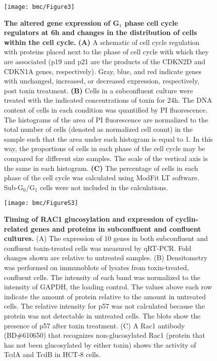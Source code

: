 \begin{SCfigure}
  \centering
  \texttt{[image: bmc/Figure3]}
  \caption[The altered gene expression of 
  G$_{\text{1}}$ phase cell cycle regulators 
  at 6h and changes in the distribution of cells 
  within the cell cycle]{
  \textbf{The altered gene expression of 
  G$_{\text{1}}$ phase cell cycle regulators 
  at 6h and changes in the distribution of cells 
  within the cell cycle.}
  \textbf{(A)} A schematic of cell cycle regulation 
  with proteins placed next to the phase of cell cycle 
  with which they are associated (p19 and p21 are the 
  products of the CDKN2D and CDKN1A genes, respectively). 
  Gray, blue, and red indicate genes with unchanged, 
  increased, or decreased expression, respectively, 
  post toxin treatment.
  \textbf{(B)} Cells in a subconfluent culture were 
  treated with the indicated concentrations of toxin 
  for 24h. The DNA content of cells in each condition 
  was quantified by PI fluorescence. The histograms 
  of the area of PI fluorescence are normalized to the 
  total number of cells (denoted as normalized cell count) 
  in the sample such that the area under each histogram 
  is equal to 1. In this way, the proportions of cells in 
  each phase of the cell cycle may be compared for different 
  size samples. The scale of the vertical axis is the same 
  in each histogram.
  \textbf{(C)} The percentage of cells in each phase of 
  the cell cycle was calculated using ModFit LT software. 
  Sub-G$_{\text{0}}$/G$_{\text{1}}$ cells were not included 
  in the calculations.
}
  \label{bmc:fig3}
\end{SCfigure}

\begin{figure}[h!]
  \centering
  \texttt{[image: bmc/FigureS3]}
  \caption[Timing of RAC1 glucosylation and expression of 
             cyclin-related genes and proteins in
             subconfluent and confluent cultures.]{
  \textbf{Timing of RAC1 glucosylation and expression of 
             cyclin-related genes and proteins in
             subconfluent and confluent cultures.}
  (A) The expression of 10 genes in both subconfluent
   and confluent toxin-treated cells was measured 
  by qRT-PCR. Fold changes shown are relative 
  to untreated samples.
  (B) Densitometry was performed on immunoblots 
  of lysates from toxin-treated, confluent cells. The 
  intensity of each band was normalized to the intensity 
  of GAPDH, the loading control. The values 
  above each row indicate the amount of protein relative 
  to the amount in untreated cells. The relative 
  intensity for p57 was not calculated because the protein 
  was not detectable in untreated cells. The 
  blots show the presence of p57 after toxin treatment.
  (C) A Rac1 antibody (BD\#610650) that recognizes 
  non-glucosylated Rac1 (protein that has not been 
  glucosylated by either toxin) shows the activity of 
  TcdA and TcdB in HCT-8 cells. }
  \label{bmc:figs3}
\end{figure}


